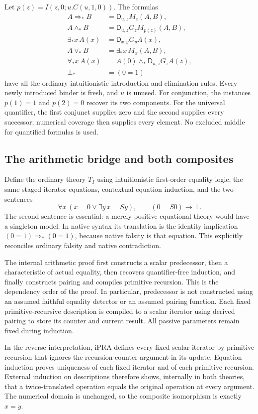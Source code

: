 \documentclass[11pt,letterpaper]{article}
\theoremstyle{definition}
\newcommand{\D}{\mathsf D}
\begin{document}
Let $p(z)=I(z,0;u.C(u,1,0))$. The formulas
\[
\begin{aligned}
 A\Rightarrow_*B&=\D_{u,z}M_z(A,B),\\
 A\wedge_*B&=\D_{u,z}G_zM_{p(z)}(A,B),\\
 \exists_*x\,A(x)&=\D_{x,y}G_yA(x),\\
 A\vee_*B&=\exists_*x\,M_x(A,B),\\
 \forall_*x\,A(x)&=A(0)\wedge_*\D_{u,z}G_zA(z),\\
 \bot_*&=(0=1)
\end{aligned}
\]
have all the ordinary intuitionistic introduction and elimination
rules. Every newly introduced binder is fresh, and $u$ is unused.
For conjunction, the instances $p(1)=1$ and $p(2)=0$ recover its two
components. For the universal quantifier, the first conjunct supplies
zero and the second supplies every successor; numerical coverage then
supplies every element. No excluded middle for quantified formulas is
used.

\subsection{The arithmetic bridge and both composites}

Define the ordinary theory $T_I$ using intuitionistic first-order equality
logic, the same staged iterator equations, contextual equation induction,
and the two sentences
\[
 \forall x\,(x=0\vee\exists y\,x=Sy),\qquad (0=S0)\to\bot.
\]
The second sentence is essential: a merely positive equational theory
would have a singleton model. In native syntax its translation is the
identity implication $(0=1)\Rightarrow_*(0=1)$, because native falsity is
that equation. This explicitly reconciles ordinary falsity and native
contradiction.

The internal arithmetic proof first constructs a scalar predecessor, then
a characteristic of actual equality, then recovers quantifier-free
induction, and finally constructs pairing and compiles primitive recursion.
This is the dependency order of the proof. In particular, predecessor
is not constructed using an assumed faithful equality detector or an
assumed pairing function. Each fixed primitive-recursive description is
compiled to a scalar iterator using derived pairing to store its counter
and current result. All passive parameters remain fixed during induction.

In the reverse interpretation, iPRA defines every fixed scalar iterator
by primitive recursion that ignores the recursion-counter argument in its
update. Equation induction proves uniqueness of each fixed iterator and
of each primitive recursion. External induction on descriptions therefore
shows, internally in both theories, that a twice-translated operation
equals the original operation at every argument. The numerical domain is
unchanged, so the composite isomorphism is exactly $x=y$.
\end{document}
